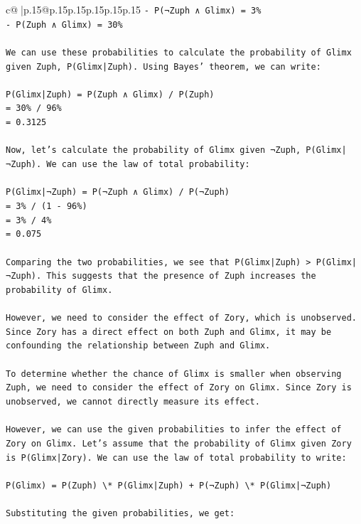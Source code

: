 \documentclass{article}
\begin{document}
{\begin{supertabular}{c@{$\;$}|p{.15\linewidth}@{}p{.15\linewidth}p{.15\linewidth}p{.15\linewidth}p{.15\linewidth}p{.15\linewidth}}
{{{\texttt{{-} P(¬Zuph ∧ Glimx) = 3\%} \\
\texttt{{-} P(Zuph ∧ Glimx) = 30\%} \\
\\ 
\texttt{We can use these probabilities to calculate the probability of Glimx given Zuph, P(Glimx|Zuph). Using Bayes' theorem, we can write:} \\
\\ 
\texttt{P(Glimx|Zuph) = P(Zuph ∧ Glimx) / P(Zuph)} \\
\texttt{= 30\% / 96\%} \\
\texttt{= 0.3125} \\
\\ 
\texttt{Now, let's calculate the probability of Glimx given ¬Zuph, P(Glimx|¬Zuph). We can use the law of total probability:} \\
\\ 
\texttt{P(Glimx|¬Zuph) = P(¬Zuph ∧ Glimx) / P(¬Zuph)} \\
\texttt{= 3\% / (1 {-} 96\%)} \\
\texttt{= 3\% / 4\%} \\
\texttt{= 0.075} \\
\\ 
\texttt{Comparing the two probabilities, we see that P(Glimx|Zuph) > P(Glimx|¬Zuph). This suggests that the presence of Zuph increases the probability of Glimx.} \\
\\ 
\texttt{However, we need to consider the effect of Zory, which is unobserved. Since Zory has a direct effect on both Zuph and Glimx, it may be confounding the relationship between Zuph and Glimx.} \\
\\ 
\texttt{To determine whether the chance of Glimx is smaller when observing Zuph, we need to consider the effect of Zory on Glimx. Since Zory is unobserved, we cannot directly measure its effect.} \\
\\ 
\texttt{However, we can use the given probabilities to infer the effect of Zory on Glimx. Let's assume that the probability of Glimx given Zory is P(Glimx|Zory). We can use the law of total probability to write:} \\
\\ 
\texttt{P(Glimx) = P(Zuph) \textbackslash{}* P(Glimx|Zuph) + P(¬Zuph) \textbackslash{}* P(Glimx|¬Zuph)} \\
\\ 
\texttt{Substituting the given probabilities, we get:} \\
}}}
\end{supertabular}}
\end{document}
